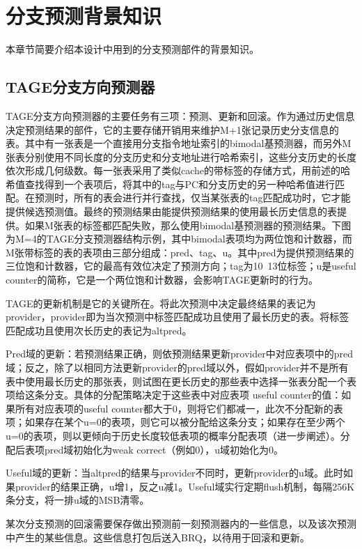 \chapter{分支预测背景知识}\label{appendix:background}
本章节简要介绍本设计中用到的分支预测部件的背景知识。
\section{TAGE分支方向预测器}
TAGE分支方向预测器的主要任务有三项：预测、更新和回滚。作为通过历史信息决定预测结果的部件，它的主要存储开销用来维护M+1张记录历史分支信息的表。其中有一张表是一个直接用分支指令地址索引的bimodal基预测器，而另外M张表分别使用不同长度的分支历史和分支地址进行哈希索引，这些分支历史的长度依次形成几何级数。每一张表采用了类似cache的带标签的存储方式，用前述的哈希值查找得到一个表项后，将其中的tag与PC和分支历史的另一种哈希值进行匹配。在预测时，所有的表会进行并行查找，仅当某张表的tag匹配成功时，它才能提供候选预测值。最终的预测结果由能提供预测结果的使用最长历史信息的表提供。如果M张表的标签都匹配失败，那么使用bimodal基预测器的预测结果。下图为M=4的TAGE分支预测器结构示例，其中bimodal表项均为两位饱和计数器，而M张带标签的表的表项由三部分组成：pred、tag、u。其中pred为提供预测结果的三位饱和计数器，它的最高有效位决定了预测方向；tag为10~13位标签；u是useful counter的简称，它是一个两位饱和计数器，会影响TAGE更新时的行为。

TAGE的更新机制是它的关键所在。将此次预测中决定最终结果的表记为provider，provider即为当次预测中标签匹配成功且使用了最长历史的表。将标签匹配成功且使用次长历史的表记为altpred。

Pred域的更新：若预测结果正确，则依预测结果更新provider中对应表项中的pred域；反之，除了以相同方法更新provider的pred域以外，假如provider并不是所有表中使用最长历史的那张表，则试图在更长历史的那些表中选择一张表分配一个表项给这条分支。具体的分配策略决定于这些表中对应表项	useful counter的值：如果所有对应表项的useful counter都大于0，则将它们都减一，此次不分配新的表项；如果存在某个u=0的表项，则它可以被分配给这条分支；如果存在至少两个u=0的表项，则以更倾向于历史长度较低表项的概率分配表项（进一步阐述）。分配后表项pred域初始化为weak correct（例如0），u域初始化为0。

Useful域的更新：当altpred的结果与provider不同时，更新provider的u域。此时如果provider的结果正确，u增1，反之u减1。Useful域实行定期flush机制，每隔256K条分支，将一排u域的MSB清零。

某次分支预测的回滚需要保存做出预测前一刻预测器内的一些信息，以及该次预测中产生的某些信息。这些信息打包后送入BRQ，以待用于回滚和更新。